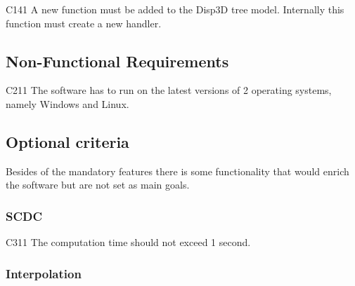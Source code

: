 	\begin{aims}
		
		\item[C141] A new function must be added to the Disp3D tree model. Internally this function must create a new 								handler.%
		
	\end{aims}
	
\subsection{Non-Functional Requirements}
	
	
	
	
	\begin{aims}

		\item[C211] The software has to run on the latest versions of 2 operating systems, namely Windows and Linux.%
	
	\end{aims}
	
\subsection{Optional criteria}
	
	Besides of the mandatory features there is some functionality that would enrich the software but are not set as main goals.  %
	
\subsubsection{SCDC}
	
	\begin{aims}
		
		\item[C311] The computation time should not exceed 1 second.
			
	\end{aims}
	
\subsubsection{Interpolation}

